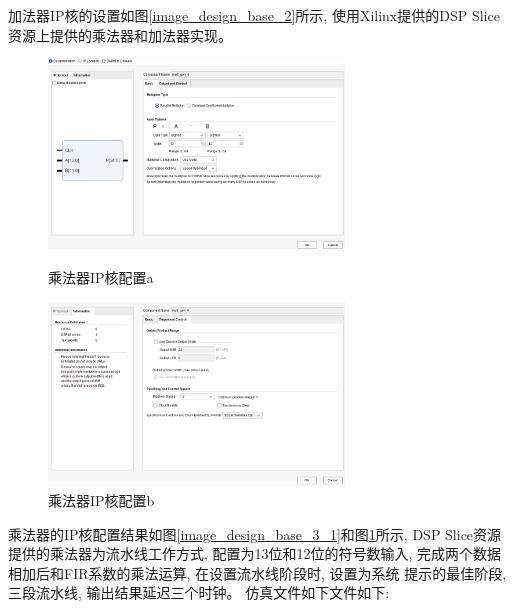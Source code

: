 \documentclass{article}
\begin{document}
加法器IP核的设置如图\ref{image_design_base_2}所示, 使用Xilinx提供的DSP Slice资源上提供的乘法器和加法器实现。
\begin{figure}[H]
    \begin{minipage}[t]{0.45\linewidth}
        \centering
        \includegraphics[width=0.7\textwidth]{image/2024-06-26-16-09-08.png}
        \caption{乘法器IP核配置a}
        \label{image_design_base_3_1}
    \end{minipage}
    \begin{minipage}[t]{0.45\linewidth}
        \centering
        \includegraphics[width=0.7\textwidth]{image/2024-06-26-16-11-08.png}
        \caption{乘法器IP核配置b}
        \label{image_design_base_3_2}
    \end{minipage}
\end{figure}
乘法器的IP核配置结果如图\ref{image_design_base_3_1}和图\ref{image_design_base_3_2}所示, DSP Slice资源提供的乘法器为流水线工作方式, 
配置为13位和12位的符号数输入, 完成两个数据相加后和FIR系数的乘法运算, 在设置流水线阶段时, 设置为系统
提示的最佳阶段, 三段流水线, 输出结果延迟三个时钟。
仿真文件如下文件如下:
\end{document}
